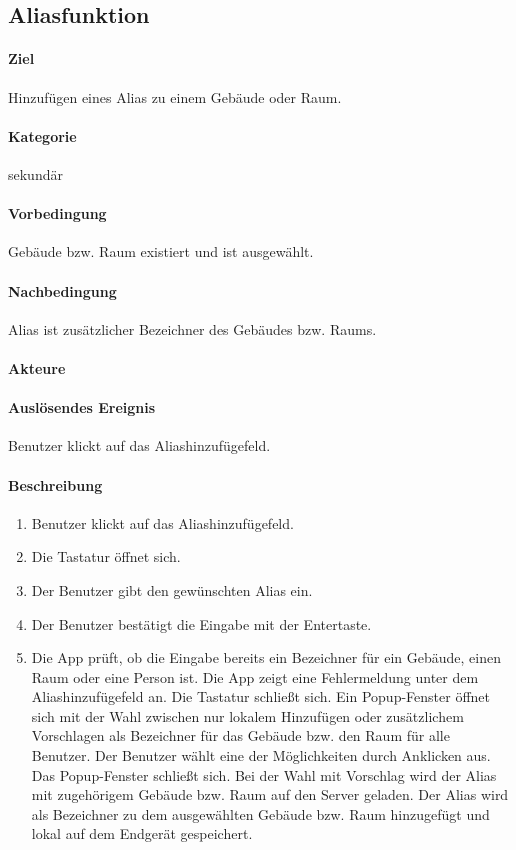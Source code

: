 \subsection{Aliasfunktion}
\label{Aliasfunktion}
\paragraph{Ziel}
Hinzufügen eines Alias zu einem Gebäude oder Raum.
\paragraph{Kategorie}
sekundär
\paragraph{Vorbedingung}
Gebäude bzw. Raum existiert und ist ausgewählt.
\paragraph{Nachbedingung}
Alias ist zusätzlicher Bezeichner des Gebäudes bzw. Raums.
\paragraph{Akteure}

\paragraph{Auslösendes Ereignis}
Benutzer klickt auf das Aliashinzufügefeld.
\paragraph{Beschreibung}
\begin{enumerate}
    \item Benutzer klickt auf das Aliashinzufügefeld.
    \item Die Tastatur öffnet sich.
    \item Der Benutzer gibt den gewünschten Alias ein.
    \item Der Benutzer bestätigt die Eingabe mit der Entertaste.
    \item Die App prüft, ob die Eingabe bereits ein Bezeichner für ein Gebäude, einen Raum oder eine Person ist.
     Die App zeigt eine Fehlermeldung unter dem Aliashinzufügefeld an.
     Die Tastatur schließt sich.
    \subitem Ein Popup-Fenster öffnet sich mit der Wahl zwischen nur lokalem Hinzufügen oder zusätzlichem Vorschlagen als Bezeichner für das Gebäude bzw. den Raum für alle Benutzer.
    \subitem Der Benutzer wählt eine der Möglichkeiten durch Anklicken aus. 
    \subitem Das Popup-Fenster schließt sich.
    \subitem Bei der Wahl mit Vorschlag wird der Alias mit zugehörigem Gebäude bzw. Raum auf den Server geladen.
    \subitem Der Alias wird als Bezeichner zu dem ausgewählten Gebäude bzw. Raum hinzugefügt und lokal auf dem Endgerät gespeichert.
\end{enumerate}